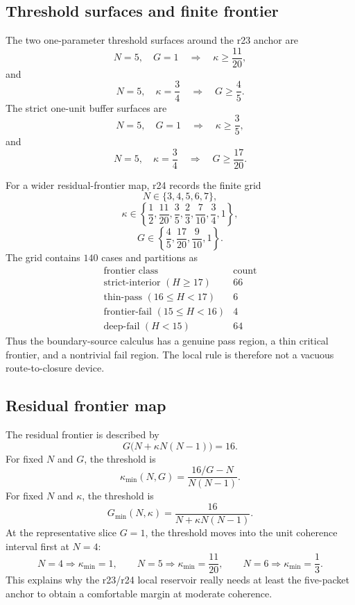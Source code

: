 \subsection{Threshold surfaces and finite frontier}
\label{subsec:v470-r24-threshold-surfaces-frontier}

The two one-parameter threshold surfaces around the r23 anchor are
\[
N=5,
\quad G=1
\quad\Longrightarrow\quad
\kappa\geq\frac{11}{20},
\]
and
\[
N=5,
\quad \kappa=\frac34
\quad\Longrightarrow\quad
G\geq\frac45.
\]
The strict one-unit buffer surfaces are
\[
N=5,
\quad G=1
\quad\Longrightarrow\quad
\kappa\geq\frac35,
\]
and
\[
N=5,
\quad \kappa=\frac34
\quad\Longrightarrow\quad
G\geq\frac{17}{20}.
\]

For a wider residual-frontier map, r24 records the finite grid
\[
N\in\{3,4,5,6,7\},
\]
\[
\kappa\in\left\{\frac12,\frac{11}{20},\frac35,\frac23,
\frac7{10},\frac34,1\right\},
\]
\[
G\in\left\{\frac45,\frac{17}{20},\frac9{10},1\right\}.
\]
The grid contains \(140\) cases and partitions as
\[
\boxed{
\begin{array}{c|c}
\text{frontier class} & \text{count}\\
\hline
\text{strict-interior }(H\geq17) & 66\\
\text{thin-pass }(16\leq H<17) & 6\\
\text{frontier-fail }(15\leq H<16) & 4\\
\text{deep-fail }(H<15) & 64
\end{array}
}
\]
Thus the boundary-source calculus has a genuine pass region, a thin critical
frontier, and a nontrivial fail region.  The local rule is therefore not a
vacuous route-to-closure device.

\subsection{Residual frontier map}
\label{subsec:v470-r24-residual-frontier-map}

The residual frontier is described by
\[
G\bigl(N+\kappa N(N-1)\bigr)=16.
\]
For fixed \(N\) and \(G\), the threshold is
\[
\kappa_{\min}(N,G)=\frac{16/G-N}{N(N-1)}.
\]
For fixed \(N\) and \(\kappa\), the threshold is
\[
G_{\min}(N,\kappa)=\frac{16}{N+\kappa N(N-1)}.
\]
At the representative slice \(G=1\), the threshold moves into the unit
coherence interval first at \(N=4\):
\[
N=4\Rightarrow \kappa_{\min}=1,
\qquad
N=5\Rightarrow \kappa_{\min}=\frac{11}{20},
\qquad
N=6\Rightarrow \kappa_{\min}=\frac13.
\]
This explains why the r23/r24 local reservoir really needs at least the
five-packet anchor to obtain a comfortable margin at moderate coherence.

